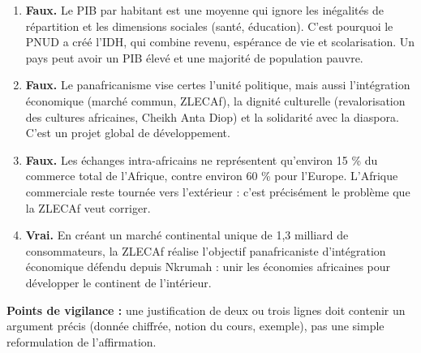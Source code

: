 \documentclass[11pt]{article}
\newcommand{\cle}[1]{{\popxbold\color{popdark}#1}}
\begin{document}
\begin{corrige}
\begin{enumerate}
\item \textbf{Faux.} Le PIB par habitant est une moyenne qui ignore les inégalités de répartition et les dimensions sociales (santé, éducation). C'est pourquoi le PNUD a créé l'\cle{IDH}, qui combine revenu, espérance de vie et scolarisation. Un pays peut avoir un PIB élevé et une majorité de population pauvre.
\item \textbf{Faux.} Le panafricanisme vise certes l'unité politique, mais aussi l'\cle{intégration économique} (marché commun, ZLECAf), la \cle{dignité culturelle} (revalorisation des cultures africaines, Cheikh Anta Diop) et la solidarité avec la diaspora. C'est un projet global de développement.
\item \textbf{Faux.} Les échanges intra-africains ne représentent qu'environ 15 \% du commerce total de l'Afrique, contre environ 60 \% pour l'Europe. L'Afrique commerciale reste tournée vers l'extérieur : c'est précisément le problème que la ZLECAf veut corriger.
\item \textbf{Vrai.} En créant un marché continental unique de 1,3 milliard de consommateurs, la ZLECAf réalise l'objectif panafricaniste d'intégration économique défendu depuis Nkrumah : unir les économies africaines pour développer le continent de l'intérieur.
\end{enumerate}
\textbf{Points de vigilance :} une justification de deux ou trois lignes doit contenir un argument précis (donnée chiffrée, notion du cours, exemple), pas une simple reformulation de l'affirmation.
\end{corrige}
\end{document}
